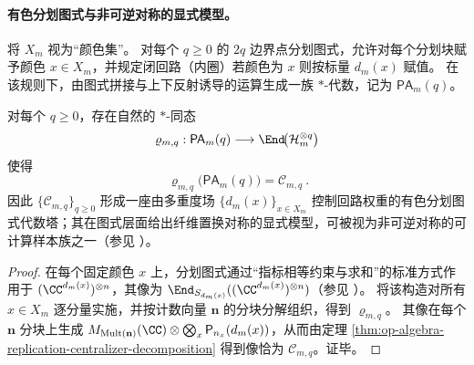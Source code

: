 \paragraph{有色分划图式与非可逆对称的显式模型。}
将 \(X_m\) 视为“颜色集”。
对每个 \(q\ge 0\) 的 \(2q\) 边界点分划图式，允许对每个分划块赋予颜色 \(x\in X_m\)，并规定闭回路（内圈）若颜色为 \(x\) 则按标量 \(d_m(x)\) 赋值。
在该规则下，由图式拼接与上下反射诱导的运算生成一族 \(\ast\)-代数，记为 \(\mathsf{PA}_m(q)\)。

\begin{proposition}[有色分划图式的算子表示与中心化刻画]\label{prop:op-algebra-colored-partition-planar-algebra}
对每个 \(q\ge 0\)，存在自然的 \(\ast\)-同态
\[
\varrho_{m,q}:\mathsf{PA}_m(q)\longrightarrow \End\!\bigl(\mathcal{H}_m^{\otimes q}\bigr)
\]
使得
\[
\boxed{\ \varrho_{m,q}\bigl(\mathsf{PA}_m(q)\bigr)=\mathcal{C}_{m,q}\ }.
\]
因此 \(\{\mathcal{C}_{m,q}\}_{q\ge 0}\) 形成一座由多重度场 \(\{d_m(x)\}_{x\in X_m}\) 控制回路权重的有色分划图式代数塔；其在图式层面给出纤维置换对称的显式模型，可被视为非可逆对称的可计算样本族之一（参见 \cite{Shao2308.00747NonInvertibleTASI}）。
\end{proposition}
\begin{proof}
在每个固定颜色 \(x\) 上，分划图式通过“指标相等约束与求和”的标准方式作用于 \((\CC^{d_m(x)})^{\otimes n}\)，其像为 \(\End_{S_{d_m(x)}}((\CC^{d_m(x)})^{\otimes n})\)（参见 \cite{BenkartHalverson2017PartitionInvariants}）。
将该构造对所有 \(x\in X_m\) 逐分量实施，并按计数向量 \(\mathbf n\) 的分块分解组织，得到 \(\varrho_{m,q}\)。
其像在每个 \(\mathbf n\) 分块上生成
\(
M_{\Mult(\mathbf n)}(\CC)\otimes\bigotimes_x \mathsf{P}_{n_x}(d_m(x))
\)，从而由定理 \ref{thm:op-algebra-replication-centralizer-decomposition} 得到像恰为 \(\mathcal{C}_{m,q}\)。证毕。
\end{proof}

\endinput

